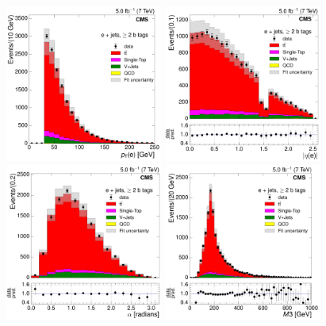 \begin{figure}[hbtp]
    \centering
     \includegraphics[width=0.46\textwidth]{Chapters/07_08_09_Analysis/Images/control_plots/after_fit/7TeV/electron_pT_2orMoreBtags_with_ratio}\hfill
     \includegraphics[width=0.46\textwidth]{Chapters/07_08_09_Analysis/Images/control_plots/after_fit/7TeV/electron_AbsEta_2orMoreBtags_with_ratio}\\                            
     \includegraphics[width=0.46\textwidth]{Chapters/07_08_09_Analysis/Images/control_plots/after_fit/7TeV/EPlusJets_angle_bl_2orMoreBtags_with_ratio}\hfill
     \includegraphics[width=0.46\textwidth]{Chapters/07_08_09_Analysis/Images/control_plots/after_fit/7TeV/EPlusJets_M3_2orMoreBtags_with_ratio}\\     

\end{figure}
